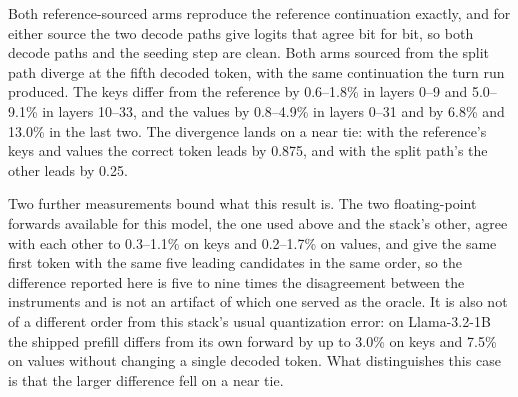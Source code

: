 \documentclass{article}
\begin{document}
Both reference-sourced arms reproduce the reference continuation exactly, and for either source the two decode paths
give logits that agree bit for bit, so both decode paths and the seeding step are clean. Both arms sourced from the
split path diverge at the fifth decoded token, with the same continuation the turn run produced. The keys
differ from the reference by 0.6--1.8\% in layers 0--9 and 5.0--9.1\% in layers 10--33, and the values by 0.8--4.9\% in
layers 0--31 and by 6.8\% and 13.0\% in the last two. The divergence lands on a near tie: with the reference's keys and
values the correct token leads by 0.875, and with the split path's the other leads by 0.25.

Two further measurements bound what this result is. The two floating-point forwards available for this model, the
one used above and the stack's other, agree with each other to 0.3--1.1\% on keys and 0.2--1.7\% on values, and give
the same first token with the same five leading candidates in the same order, so the difference reported here is five
to nine times the disagreement between the instruments and is not an artifact of which one served as the oracle. It
is also not of a different order from this stack's usual quantization error: on Llama-3.2-1B the shipped prefill
differs from its own forward by up to 3.0\% on keys and 7.5\% on values without changing a single decoded token. What
distinguishes this case is that the larger difference fell on a near tie.
\end{document}
